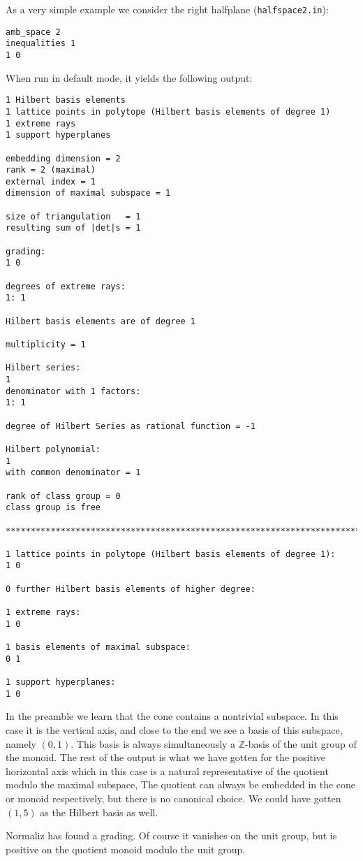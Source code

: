 \documentclass[12pt,a4paper]{scrartcl}
\theoremstyle{definition}
\def\ZZ{{\mathbb Z}}
\begin{document}
As a very simple example we consider the right halfplane (\verb|halfspace2.in|):
\begin{Verbatim}
amb_space 2
inequalities 1 
1 0
\end{Verbatim}
When run in default mode, it yields the following output:
\begin{Verbatim}
1 Hilbert basis elements
1 lattice points in polytope (Hilbert basis elements of degree 1)
1 extreme rays
1 support hyperplanes

embedding dimension = 2
rank = 2 (maximal)
external index = 1
dimension of maximal subspace = 1

size of triangulation   = 1
resulting sum of |det|s = 1

grading:
1 0 

degrees of extreme rays:
1: 1  

Hilbert basis elements are of degree 1

multiplicity = 1

Hilbert series:
1 
denominator with 1 factors:
1: 1  

degree of Hilbert Series as rational function = -1

Hilbert polynomial:
1 
with common denominator = 1

rank of class group = 0
class group is free

***********************************************************************

1 lattice points in polytope (Hilbert basis elements of degree 1):
1 0

0 further Hilbert basis elements of higher degree:

1 extreme rays:
1 0

1 basis elements of maximal subspace:
0 1

1 support hyperplanes:
1 0
\end{Verbatim}

In the preamble we learn that the cone contains a nontrivial subspace. In this case it is the vertical axis, and close to the end we see a basis of this subspace, namely $(0,1)$. This basis is always simultaneously a $\ZZ$-basis of the unit group of the monoid. The rest of the output is what we have gotten for the positive horizontal axis which in this case is a natural representative of the quotient modulo the maximal subspace, The quotient can always be embedded in the cone or monoid respectively, but there is no canonical choice. We could have gotten $(1,5)$ as the Hilbert basis as well.

Normaliz has found a grading. Of course it vanishes on the unit group, but is positive on the quotient monoid modulo the unit group.
\end{document}
